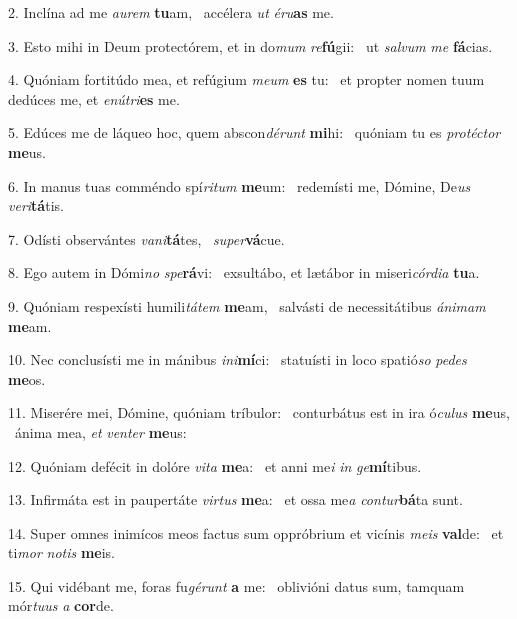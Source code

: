 2. Inclína ad me \textit{au}\textit{rem} \textbf{tu}am, \ast\  accélera \textit{ut} \textit{é}\textit{ru}\textbf{as} me.\

3. Esto mihi in Deum protectórem, et in do\textit{mum} \textit{re}\textbf{fú}gii: \ast\  ut \textit{sal}\textit{vum} \textit{me} \textbf{fá}cias.\

4. Quóniam fortitúdo mea, et refúgium \textit{me}\textit{um} \textbf{es} tu: \ast\  et propter nomen tuum dedúces me, et \textit{e}\textit{nú}\textit{tri}\textbf{es} me.\

5. Edúces me de láqueo hoc, quem abscon\textit{dé}\textit{runt} \textbf{mi}hi: \ast\  quóniam tu es \textit{pro}\textit{téc}\textit{tor} \textbf{me}us.\

6. In manus tuas comméndo spí\textit{ri}\textit{tum} \textbf{me}um: \ast\  redemísti me, Dómine, De\textit{us} \textit{ve}\textit{ri}\textbf{tá}tis.\

7. Odísti observántes \textit{va}\textit{ni}\textbf{tá}tes, \ast\  \textit{su}\textit{per}\textbf{vá}cue.\

8. Ego autem in Dómi\textit{no} \textit{spe}\textbf{rá}vi: \ast\  exsultábo, et lætábor in miseri\textit{cór}\textit{di}\textit{a} \textbf{tu}a.\

9. Quóniam respexísti humili\textit{tá}\textit{tem} \textbf{me}am, \ast\  salvásti de necessitátibus \textit{á}\textit{ni}\textit{mam} \textbf{me}am.\

10. Nec conclusísti me in mánibus \textit{in}\textit{i}\textbf{mí}ci: \ast\  statuísti in loco spatió\textit{so} \textit{pe}\textit{des} \textbf{me}os.\

11. Miserére mei, Dómine, quóniam tríbulor: \dag\  conturbátus est in ira ó\textit{cu}\textit{lus} \textbf{me}us, \ast\  ánima mea, \textit{et} \textit{ven}\textit{ter} \textbf{me}us:\

12. Quóniam defécit in dolóre \textit{vi}\textit{ta} \textbf{me}a: \ast\  et anni me\textit{i} \textit{in} \textit{ge}\textbf{mí}tibus.\

13. Infirmáta est in paupertáte \textit{vir}\textit{tus} \textbf{me}a: \ast\  et ossa me\textit{a} \textit{con}\textit{tur}\textbf{bá}ta sunt.\

14. Super omnes inimícos meos factus sum oppróbrium et vicínis \textit{me}\textit{is} \textbf{val}de: \ast\  et ti\textit{mor} \textit{no}\textit{tis} \textbf{me}is.\

15. Qui vidébant me, foras fu\textit{gé}\textit{runt} \textbf{a} me: \ast\  oblivióni datus sum, tamquam mór\textit{tu}\textit{us} \textit{a} \textbf{cor}de.\

